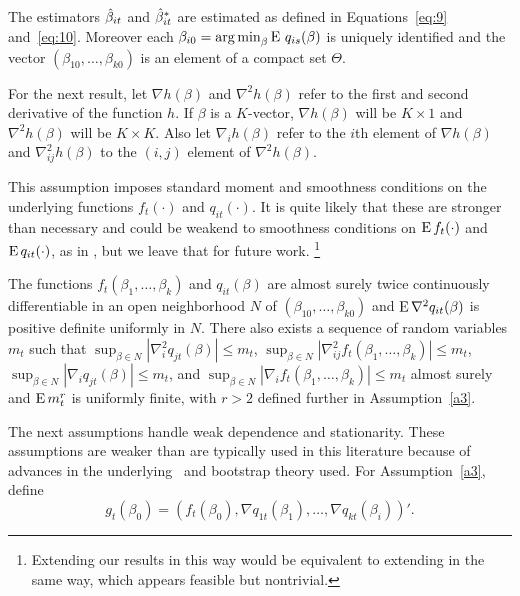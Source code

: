 \documentclass[12pt,fleqn]{article}
\begin{document}
\begin{asmp}\label{a1}
  The estimators $\hat \beta_{it}$ and $\hat \beta_{it}^*$ are estimated as defined in
  Equations~\eqref{eq:9} and~\eqref{eq:10}. Moreover each $\beta_{i0} =
  \operatorname*{arg\,min}_\beta \operatorname{E}\, q_{is}(\beta)$ is uniquely identified and the vector
  $(\beta_{10},\dots,\beta_{k0})$ is an element of a compact set $\Theta$.
\end{asmp}

For the next result, let $\nabla h(\beta)$ and $\nabla^2 h(\beta)$
refer to the first and second derivative of the function $h$. If
$\beta$ is a $K$-vector, $\nabla h(\beta)$ will be $K \times 1$ and
$\nabla^2 h(\beta)$ will be $K \times K$. Also let $\nabla_i h(\beta)$
refer to the $i$th element of $\nabla h(\beta)$ and $\nabla_{ij}^2
h(\beta)$ to the $(i,j)$ element of $\nabla^2 h(\beta)$.

This assumption imposes standard moment and smoothness conditions on
the underlying functions $f_t(\cdot)$ and $q_{it}(\cdot)$. It is quite
likely that these are stronger than necessary and could be weakend to
smoothness conditions on $\operatorname{E} f_t(\cdot)$ and $\operatorname{E} q_{it}(\cdot)$, as in
\cite{Mcc:00}, but we leave that for future work.%
\footnote{Extending our results in this way would be equivalent to
  extending \cite{JoD:00} in the same way, which appears feasible but
  nontrivial.} %

\begin{asmp}\label{a2}
  The functions $f_t(\beta_1,\dots,\beta_k)$ and $q_{it}(\beta)$ are
  almost surely twice continuously differentiable in an open
  neighborhood $N$ of $(\beta_{10},\dots,\beta_{k0})$ and $\operatorname{E} \nabla^2
  q_{it}(\beta)$ is positive definite uniformly in $N$. There also
  exists a sequence of random variables $m_t$ such that
  $\sup_{\beta \in N} |\nabla_i^2 q_{jt}(\beta)| \leq m_t$,
  $\sup_{\beta \in N} |\nabla_{ij}^2 f_t(\beta_1,\dots,\beta_k)| \leq m_t$,
  $\sup_{\beta \in N} |\nabla_i q_{jt}(\beta)| \leq m_t$, and
  $\sup_{\beta \in N} |\nabla_i f_t(\beta_1,\dots,\beta_k)| \leq m_t$
  almost surely and $\operatorname{E} m_t^r$ is uniformly finite, with $r > 2$
  defined further in Assumption~\ref{a3}.
\end{asmp}

The next assumptions handle weak dependence and stationarity. These
assumptions are weaker than are typically used in this literature
because of advances in the underlying \clt\ and bootstrap theory used.
For Assumption~\ref{a3}, define
\[
  g_t(\beta_0) = (f_t(\beta_0), \nabla q_{1t}(\beta_1),\dots,\nabla q_{kt}(\beta_i))'.
\]
\end{document}
